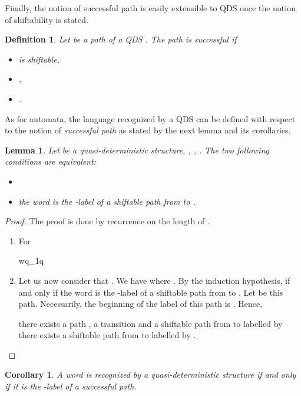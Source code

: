 \documentclass[11pt]{elsarticle}
\newtheorem{definition}{Definition}
\newtheorem{lemma}{Lemma}
\newtheorem{corollary}{Corollary}
\newcommand\modif[2]{{#2}}
\begin{document}
 


 \modif{}{Finally, the notion of successful path is easily extensible to QDS once the notion of shiftability is stated}.
  \begin{definition}\label{def successful}
    Let  be a path of a QDS  . The path  is \emph{successful} if 
  \begin{itemize}
  \item  is shiftable,
  \item ,
  \item .
  \end{itemize}
\end{definition}
 



As for automata, the language recognized by a QDS can be defined with respect to the notion of \emph{successful path}
as stated by the next lemma and its corollaries.
\begin{lemma}
Let  be a quasi-deterministic structure, , , . The two following conditions are equivalent:
\begin{itemize}
\item 
\item the word  is the -label of  a shiftable path from  to . 
\end{itemize}
\end{lemma}
\begin{proof}

The proof  is done by \modif{induction}{recurrence} on the length of . 
 \begin{enumerate}
   \item For \\    
   \centerline{wq_1q}
    \smallskip
   \item Let us now consider that . We have  where . By the induction hypothesis,  if and only if the word  is the -label of a shiftable path from  to .    
 Let  be this path. Necessarily, the beginning of the label of this path  is . 
 Hence, 
    
  there exists a path  , a transition   and a shiftable path from  to  labelled by  
  there exists a shiftable path from  to  labelled by .
 \end{enumerate}
\end{proof}

\begin{corollary}\label{Cor-1}
A word is recognized by  a quasi-deterministic structure if and only if it is the -label of a successful path.
\end{corollary}
\end{document}

